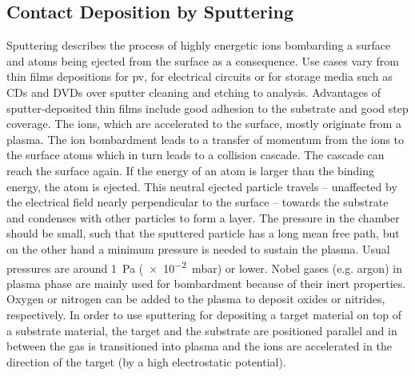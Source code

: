 \subsection{Contact Deposition by Sputtering}
Sputtering describes the process of highly energetic ions bombarding a surface and atoms being ejected from the surface as a consequence.
%
Use cases vary from thin films depositions for \gls{pv}, 
for electrical circuits or for storage media such as CDs and DVDs 
over sputter cleaning and etching to analysis.
Advantages of sputter-deposited thin films include good adhesion to the substrate 
and good step coverage\cite{Swann1988}.
The ions, which are accelerated to the surface, mostly originate from a plasma.
The ion bombardment leads to a transfer of momentum from the ions to the surface atoms which in turn leads to a collision cascade. 
The cascade can reach the surface again. 
If the energy of an atom is larger than the binding energy, the atom is ejected. 
This neutral ejected particle travels -- unaffected by the electrical field nearly perpendicular to the surface -- towards the substrate and condenses with other particles to form a layer.
The pressure in the chamber should be small, such that the sputtered particle has a long mean free path, but on the other hand 
a minimum pressure is needed to sustain the plasma.
Usual pressures are around \SI{1}{\Pa} (\num{e-2}\SI{}{\milli\bar}) or lower\cite{Swann1988}.
Nobel gases (e.g. argon) in plasma phase are mainly used for bombardment because of their inert properties. 
Oxygen or nitrogen can be added to the plasma to deposit oxides or nitrides, respectively.
In order to use sputtering for depositing a target material on top of a substrate material, 
the target and the substrate are positioned parallel and in between the gas is transitioned into plasma and the ions are accelerated in the direction of the target (by a high electrostatic potential). 



